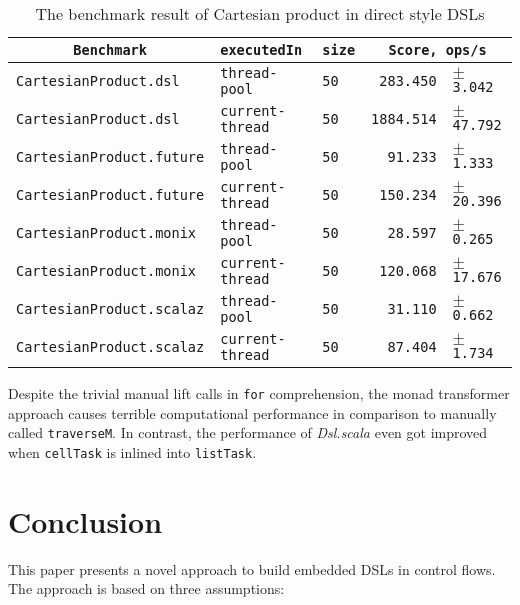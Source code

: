\begin{table}[htbp]
  \begin{tabular}{l|l|l|rl}
   \multicolumn{1}{c|}{\texttt{Benchmark}} & \texttt{executedIn} & \texttt{size} & \multicolumn{2}{c}{\texttt{Score, ops/s}} \\
  \hline
  \texttt{CartesianProduct.dsl} & \texttt{thread-pool} & \texttt{50} & \texttt{283.450} & \scriptsize $\pm$ \texttt{3.042}  \\
  \texttt{CartesianProduct.dsl} & \texttt{current-thread} & \texttt{50} & \texttt{1884.514} & \scriptsize $\pm$ \texttt{47.792}  \\
  \texttt{CartesianProduct.future} & \texttt{thread-pool} & \texttt{50} & \texttt{91.233} & \scriptsize $\pm$ \texttt{1.333}  \\
  \texttt{CartesianProduct.future} & \texttt{current-thread} & \texttt{50} & \texttt{150.234} & \scriptsize $\pm$ \texttt{20.396}  \\
  \texttt{CartesianProduct.monix} & \texttt{thread-pool} & \texttt{50} & \texttt{28.597} & \scriptsize $\pm$ \texttt{0.265}  \\
  \texttt{CartesianProduct.monix} & \texttt{current-thread} & \texttt{50} & \texttt{120.068} & \scriptsize $\pm$ \texttt{17.676}  \\
  \texttt{CartesianProduct.scalaz} & \texttt{thread-pool} & \texttt{50} & \texttt{31.110} & \scriptsize $\pm$ \texttt{0.662}  \\
  \texttt{CartesianProduct.scalaz} & \texttt{current-thread} & \texttt{50} & \texttt{87.404} & \scriptsize $\pm$ \texttt{1.734}  \\
  \end{tabular}
  \caption{The benchmark result of Cartesian product in direct style DSLs}
  \label{CartesianProduct}
\end{table}

Despite the trivial manual lift calls in \lstinline{for} comprehension, the monad transformer approach causes terrible computational performance in comparison to manually called \lstinline{traverseM}. In contrast, the performance of \textit{Dsl.scala} even got improved when \lstinline{cellTask} is inlined into \lstinline{listTask}.

\section{Conclusion}\label{Conclusion}

This paper presents a novel approach to build embedded DSLs in control flows. The approach is based on three assumptions:

